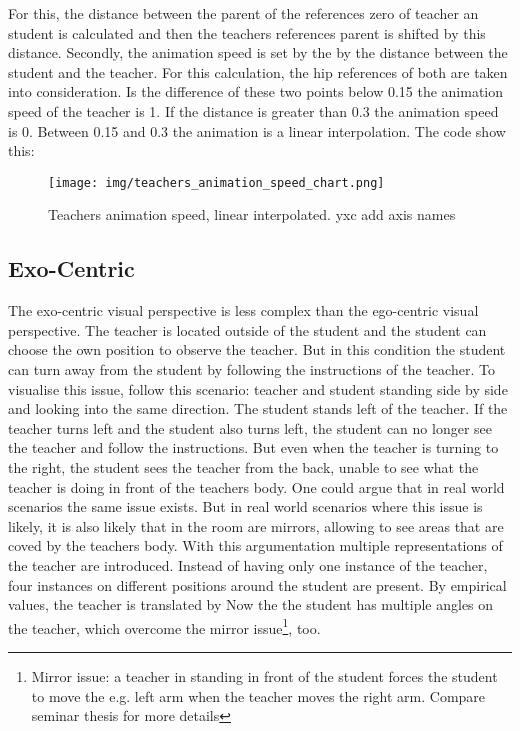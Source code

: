 For this, the distance between the parent of the references zero of teacher an student is calculated and then the teachers references parent is shifted by this distance. Secondly, the animation speed is set by the by the distance between the student and the teacher. For this calculation, the hip references of both are taken into consideration. Is the difference of these two points below 0.15 the animation speed of the teacher is 1. If the distance is greater than 0.3 the animation speed is 0. Between 0.15 and 0.3 the animation is a linear interpolation. The code show this: %
\begin{figure}
	\centering
	\texttt{[image: img/teachers\_animation\_speed\_chart.png]}
	\caption{Teachers animation speed, linear interpolated. yxc add axis names}
	\label{fig:teachers_animation_speed_chart}
\end{figure}

\subsection{Exo-Centric}
The exo-centric visual perspective is less complex than the ego-centric visual perspective. The teacher is located outside of the student and the student can choose the own position to observe the teacher. But in this condition the student can turn away from the student by following the instructions of the teacher. To visualise this issue, follow this scenario: teacher and student standing side by side and looking into the same direction. The student stands left of the teacher. If the teacher turns left and the student also turns left, the student can no longer see the teacher and follow the instructions. But even when the teacher is turning to the right, the student sees the teacher from the back, unable to see what the teacher is doing in front of the teachers body. One could argue that in real world scenarios the same issue exists. But in real world scenarios where this issue is likely, it is also likely that in the room are mirrors, allowing to see areas that are coved by the teachers body. With this argumentation multiple representations of the teacher are introduced. Instead of having only one instance of the teacher, four instances on different positions around the student are present. By empirical values, the teacher is translated by %
Now the the student has multiple angles on the teacher, which overcome the mirror issue\footnote{Mirror issue: a teacher in standing in front of the student forces the student to move the e.g. left arm when the teacher moves the right arm. Compare seminar thesis for more details}, too.
